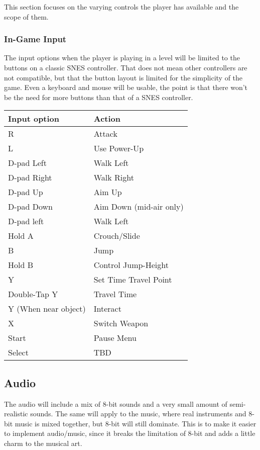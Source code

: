 \documentclass[12pt]{article}
\begin{document}
This section focuses on the varying controls the player has available and the scope of them. 

\subsubsection{In-Game Input}

The input options when the player is playing in a level will be limited to the buttons on a classic SNES controller. That does not mean other controllers are not compatible, but that the button layout is limited for the simplicity of the game. Even a keyboard and mouse will be usable, the point is that there won't be the need for more buttons than that of a SNES controller. 

\begin{center}
\begin{tabular}{ | l | l | }
 \hline
 \textbf{Input option} & \textbf{Action} \\
 \hline
 R & Attack \\  
 \hline 
 L & Use Power-Up \\
 \hline
 D-pad Left & Walk Left \\
 \hline
 D-pad Right & Walk Right \\
 \hline
 D-pad Up & Aim Up \\
 \hline
 D-pad Down & Aim Down (mid-air only) \\
 \hline
 D-pad left & Walk Left \\
 \hline
 Hold A & Crouch/Slide \\
 \hline
 B & Jump \\
 \hline
 Hold B & Control Jump-Height\\
 \hline
 Y & Set Time Travel Point \\
 \hline
 Double-Tap Y & Travel Time \\
 \hline
  Y (When near object) & Interact \\
 \hline
 X & Switch Weapon \\
 \hline
 Start & Pause Menu \\
 \hline
 Select & TBD \\
 \hline
\end{tabular}
\end{center}

\subsection{Audio}

The audio will include a mix of 8-bit sounds and a very small amount of semi-realistic sounds. The same will apply to the music, where real instruments and 8-bit music is mixed together, but 8-bit will still dominate. This is to make it easier to implement audio/music, since it breaks the limitation of 8-bit and adds a little charm to the musical art. 
\end{document}
